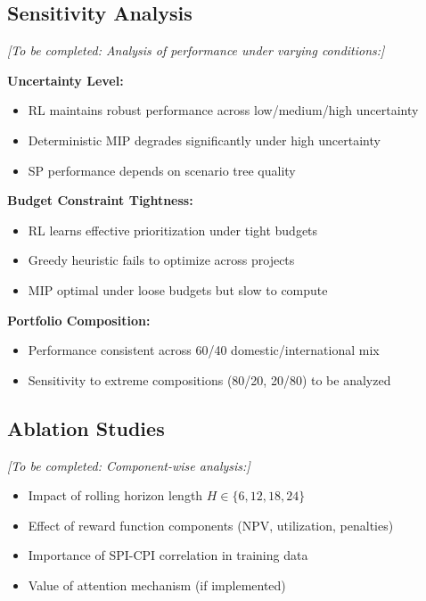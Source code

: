 \subsection{Sensitivity Analysis}

\textit{[To be completed: Analysis of performance under varying conditions:]}

\textbf{Uncertainty Level:}
\begin{itemize}
    \item RL maintains robust performance across low/medium/high uncertainty
    \item Deterministic MIP degrades significantly under high uncertainty
    \item SP performance depends on scenario tree quality
\end{itemize}

\textbf{Budget Constraint Tightness:}
\begin{itemize}
    \item RL learns effective prioritization under tight budgets
    \item Greedy heuristic fails to optimize across projects
    \item MIP optimal under loose budgets but slow to compute
\end{itemize}

\textbf{Portfolio Composition:}
\begin{itemize}
    \item Performance consistent across 60/40 domestic/international mix
    \item Sensitivity to extreme compositions (80/20, 20/80) to be analyzed
\end{itemize}

\subsection{Ablation Studies}

\textit{[To be completed: Component-wise analysis:]}

\begin{itemize}
    \item Impact of rolling horizon length $H \in \{6, 12, 18, 24\}$
    \item Effect of reward function components (NPV, utilization, penalties)
    \item Importance of SPI-CPI correlation in training data
    \item Value of attention mechanism (if implemented)
\end{itemize}

